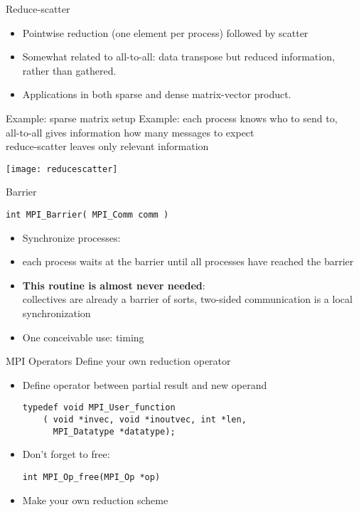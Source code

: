 \begin{numberedframe}{Reduce-scatter}
  \begin{itemize}
  \item 
    Pointwise reduction (one element per process) followed by scatter
  \item 
    Somewhat related to all-to-all: data transpose but reduced
    information, rather than gathered.
  \item Applications in both sparse and dense matrix-vector product.
  \end{itemize}
\end{numberedframe}

\begin{numberedframe}{Example: sparse matrix setup}
  Example: each process knows who to send to, \\
  all-to-all gives information how many messages to expect\\
  reduce-scatter leaves only relevant information

  \texttt{[image: reducescatter]}
\end{numberedframe}

\begin{numberedframe}{Barrier}
\begin{lstlisting}
int MPI_Barrier( MPI_Comm comm )
\end{lstlisting}
  \begin{itemize}
  \item Synchronize processes:
  \item each process waits at the barrier until all processes have reached the barrier
  \item \textbf{This routine is almost never needed}:\\
    collectives are already a barrier of sorts, two-sided
    communication is a local synchronization
  \item One conceivable use: timing
  \end{itemize}
\end{numberedframe}


\begin{numberedframe}{MPI Operators}
  Define your own reduction operator
  \begin{itemize}
  \item Define operator between partial result and new operand
\lstset{language=C}
\begin{lstlisting}
typedef void MPI_User_function
    ( void *invec, void *inoutvec, int *len, 
      MPI_Datatype *datatype); 
\end{lstlisting}
\item Don't forget to free:
\lstset{language=C}
\begin{lstlisting}
int MPI_Op_free(MPI_Op *op)  
\end{lstlisting}
\item Make your own reduction scheme 
  \end{itemize}
\end{numberedframe}

